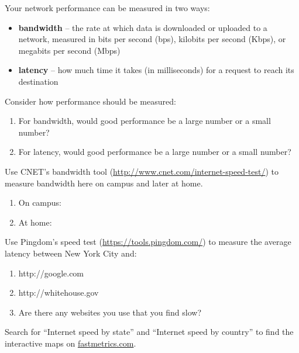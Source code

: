 
Your network performance can be measured in two ways:

\begin{itemize}[itemsep=0pt]
\item \textbf{bandwidth} -- the rate at which data is downloaded or uploaded to a network, measured in bits per second (bps), kilobits per second (Kbps), or megabits per second (Mbps)
\item \textbf{latency} -- how much time it takes (in milliseconds) for a request to reach its destination
\end{itemize}




\Q Consider how performance should be measured:
\begin{enumerate}
\item For bandwidth, would good performance be a large number or a small number?
\item For latency, would good performance be a large number or a small number?
\end{enumerate}


\Q Use CNET's bandwidth tool (\url{http://www.cnet.com/internet-speed-test/}) to measure bandwidth here on campus and later at home.
\begin{enumerate}
\item On campus: 
\item At home: 
\end{enumerate}


\Q Use Pingdom's speed test (\url{https://tools.pingdom.com/}) to measure the average latency between New York City and:
\begin{enumerate}
\item http://google.com 
\item http://whitehouse.gov 
\item Are there any websites you use that you find slow? 
\end{enumerate}


\Q Search for ``Internet speed by state'' and ``Internet speed by country'' to find the interactive maps on \href{https://www.fastmetrics.com/sitemap.php}{fastmetrics.com}.

